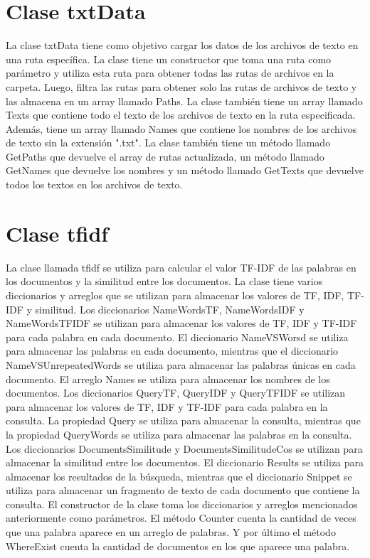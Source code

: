 \documentclass{article}
\begin{document}
\begin{center}
\section*{\textcolor{graphcolor}{{\centering Clase txtData}}}

La clase txtData tiene como objetivo cargar los datos de los archivos de texto en una ruta 
específica. La clase tiene un constructor que toma una ruta como parámetro y utiliza esta 
ruta para obtener todas las rutas de archivos en la carpeta. Luego, filtra las rutas para 
obtener solo las rutas de archivos de texto y las almacena en un array llamado Paths. La 
clase también tiene un array llamado Texts que contiene todo el texto de los archivos de texto en la ruta especificada. Además, tiene un array llamado Names que contiene los 
nombres de los archivos de texto sin la extensión ".txt". 
La clase también tiene un método llamado GetPaths que devuelve el array de rutas 
actualizada, un método llamado GetNames que devuelve los nombres y un método 
llamado GetTexts que devuelve todos los textos en los archivos de texto.

\section*{\textcolor{graphcolor}{{\centering Clase tfidf}}}
La clase llamada tfidf se utiliza para calcular el valor TF-IDF de las palabras en los 
documentos y la similitud entre los documentos. La clase tiene varios diccionarios y 
arreglos que se utilizan para almacenar los valores de TF, IDF, TF-IDF y similitud.
Los diccionarios NameWordsTF, NameWordsIDF y NameWordsTFIDF se utilizan 
para almacenar los valores de TF, IDF y TF-IDF para cada palabra en cada documento. El
diccionario NameVSWorsd se utiliza para almacenar las palabras en cada documento, 
mientras que el diccionario NameVSUnrepeatedWords se utiliza para almacenar las 
palabras únicas en cada documento. El arreglo Names se utiliza para almacenar los 
nombres de los documentos.
Los diccionarios QueryTF, QueryIDF y QueryTFIDF se utilizan para almacenar los 
valores de TF, IDF y TF-IDF para cada palabra en la consulta. La propiedad Query se 
utiliza para almacenar la consulta, mientras que la propiedad QueryWords se utiliza para 
almacenar las palabras en la consulta.
Los diccionarios DocumentsSimilitude y DocumentsSimilitudeCos se utilizan para 
almacenar la similitud entre los documentos. El diccionario Results se utiliza para 
almacenar los resultados de la búsqueda, mientras que el diccionario Snippet se utiliza 
para almacenar un fragmento de texto de cada documento que contiene la consulta.
El constructor de la clase toma los diccionarios y arreglos mencionados anteriormente 
como parámetros. El método Counter cuenta la cantidad de veces que una palabra 
aparece en un arreglo de palabras. Y por último el método WhereExist cuenta la cantidad 
de documentos en los que aparece una palabra.



\end{center}
\end{document}
